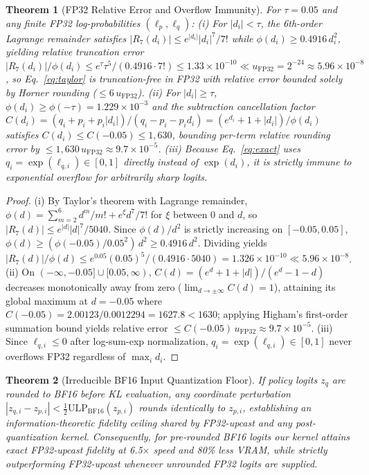 \documentclass[10pt]{article}
\newtheorem{theorem}{Theorem}
\begin{document}
\begin{theorem}[FP32 Relative Error and Overflow Immunity]
For $\tau = 0.05$ and any finite FP32 log-probabilities $(\ell_p, \ell_q)$:
(i) For $|d_i| < \tau$, the 6th-order Lagrange remainder satisfies $|R_7(d_i)| \le e^{|d_i|} |d_i|^7 / 7!$ while $\phi(d_i) \ge 0.4916\,d_i^2$, yielding relative truncation error $|R_7(d_i)|/\phi(d_i) \le e^\tau \tau^5 / (0.4916 \cdot 7!) \le 1.33\times 10^{-10} \ll u_{\mathrm{FP32}} = 2^{-24} \approx 5.96\times 10^{-8}$, so Eq.~\eqref{eq:taylor} is truncation-free in FP32 with relative error bounded solely by Horner rounding ($\le 6\,u_{\mathrm{FP32}}$).
(ii) For $|d_i| \ge \tau$, $\phi(d_i) \ge \phi(-\tau) = 1.229\times 10^{-3}$ and the subtraction cancellation factor $C(d_i) = (q_i + p_i + p_i |d_i|)/(q_i - p_i - p_i d_i) = (e^{d_i} + 1 + |d_i|)/\phi(d_i)$ satisfies $C(d_i) \le C(-0.05) \le 1{,}630$, bounding per-term relative rounding error by $\le 1{,}630\,u_{\mathrm{FP32}} \approx 9.7\times 10^{-5}$.
(iii) Because Eq.~\eqref{eq:exact} uses $q_i = \exp(\ell_{q,i}) \in [0,1]$ directly instead of $\exp(d_i)$, it is strictly immune to exponential overflow for arbitrarily sharp logits.
\end{theorem}
\begin{proof}
(i) By Taylor's theorem with Lagrange remainder, $\phi(d) = \sum_{m=2}^6 d^m/m! + e^\xi d^7/7!$ for $\xi$ between $0$ and $d$, so $|R_7(d)| \le e^{|d|}|d|^7/5040$. Since $\phi(d)/d^2$ is strictly increasing on $[-0.05, 0.05]$, $\phi(d) \ge (\phi(-0.05)/0.05^2)\,d^2 \ge 0.4916\,d^2$. Dividing yields $|R_7(d)|/\phi(d) \le e^{0.05}(0.05)^5 / (0.4916\cdot 5040) = 1.326\times 10^{-10} \ll 5.96\times 10^{-8}$.
(ii) On $(-\infty, -0.05] \cup [0.05, \infty)$, $C(d) = (e^d + 1 + |d|)/(e^d - 1 - d)$ decreases monotonically away from zero ($\lim_{d\to\pm\infty} C(d) = 1$), attaining its global maximum at $d=-0.05$ where $C(-0.05) = 2.00123 / 0.0012294 = 1627.8 < 1630$; applying Higham's first-order summation bound \citep{higham2002accuracy} yields relative error $\le C(-0.05)\,u_{\mathrm{FP32}} \approx 9.7\times 10^{-5}$.
(iii) Since $\ell_{q,i} \le 0$ after log-sum-exp normalization, $q_i = \exp(\ell_{q,i}) \in [0,1]$ never overflows FP32 regardless of $\max_i d_i$.
\end{proof}

\begin{theorem}[Irreducible BF16 Input Quantization Floor]
If policy logits $z_q$ are rounded to BF16 before KL evaluation, any coordinate perturbation $|z_{q,i} - z_{p,i}| < \frac{1}{2}\mathrm{ULP}_{\mathrm{BF16}}(z_{p,i})$ rounds identically to $z_{p,i}$, establishing an information-theoretic fidelity ceiling shared by FP32-upcast and any post-quantization kernel. Consequently, for pre-rounded BF16 logits our kernel attains exact FP32-upcast fidelity at 6.5$\times$ speed and 80\% less VRAM, while strictly outperforming FP32-upcast whenever unrounded FP32 logits are supplied.
\end{theorem}
\end{document}
